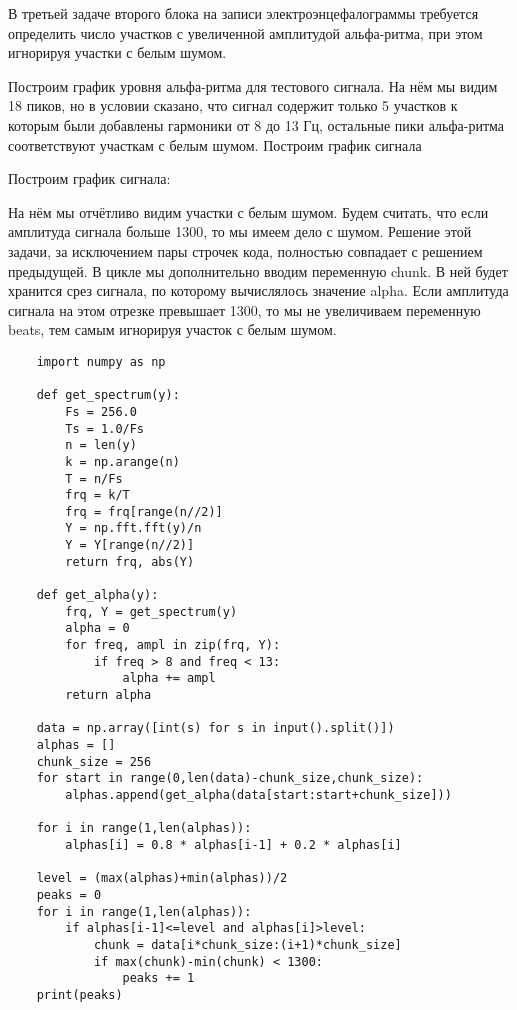 \solutionSection

В третьей задаче второго блока на записи электроэнцефалограммы требуется определить число участков с увеличенной амплитудой альфа-ритма, при этом игнорируя участки с белым шумом.

Построим график уровня альфа-ритма для тестового сигнала. На нём мы видим 18 пиков, но в условии сказано, что сигнал содержит только 5 участков к которым были добавлены гармоники от 8 до 13 Гц, остальные пики альфа-ритма соответствуют участкам с белым шумом. Построим график сигнала


Построим график сигнала:


На нём мы отчётливо видим участки с белым шумом. Будем считать, что если амплитуда сигнала больше 1300, то мы имеем дело с шумом.
Решение этой задачи, за исключением пары строчек кода, полностью совпадает с решением предыдущей.
В цикле мы дополнительно вводим переменную chunk. В ней будет хранится срез сигнала, по которому вычислялось значение alpha. Если амплитуда сигнала на этом отрезке превышает 1300, то мы не увеличиваем переменную beats, тем самым игнорируя участок с белым шумом.

\begin{verbatim}
    import numpy as np

    def get_spectrum(y):
        Fs = 256.0
        Ts = 1.0/Fs
        n = len(y)
        k = np.arange(n)
        T = n/Fs
        frq = k/T
        frq = frq[range(n//2)]
        Y = np.fft.fft(y)/n
        Y = Y[range(n//2)]
        return frq, abs(Y)

    def get_alpha(y):
        frq, Y = get_spectrum(y)
        alpha = 0
        for freq, ampl in zip(frq, Y):
            if freq > 8 and freq < 13:
                alpha += ampl
        return alpha

    data = np.array([int(s) for s in input().split()])
    alphas = []
    chunk_size = 256
    for start in range(0,len(data)-chunk_size,chunk_size):
        alphas.append(get_alpha(data[start:start+chunk_size]))

    for i in range(1,len(alphas)):
        alphas[i] = 0.8 * alphas[i-1] + 0.2 * alphas[i]

    level = (max(alphas)+min(alphas))/2
    peaks = 0
    for i in range(1,len(alphas)):
        if alphas[i-1]<=level and alphas[i]>level:
            chunk = data[i*chunk_size:(i+1)*chunk_size]
            if max(chunk)-min(chunk) < 1300:
                peaks += 1
    print(peaks)
\end{verbatim}
